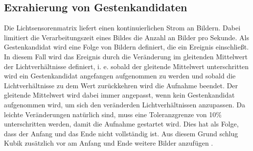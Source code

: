 \subsection{Exrahierung von Gestenkandidaten}
\label{sec:gesture_extraction}
Die Lichtsensorenmatrix liefert einen kontinuierlichen Strom an Bildern. Dabei limitiert die Verarbeitungszeit eines Bildes die Anzahl an Bilder pro Sekunde. Als Gestenkandidat wird eine Folge von Bildern definiert, die
ein Ereignis einschließt. In diesem Fall wird das Ereignis durch die Veränderung im gleitenden Mittelwert der Lichtverhältnisse definiert, i. e. sobald der gleitende Mittelwert unterschritten wird ein Gestenkandidat
angefangen aufgenommen zu werden und sobald die Lichtverhältnisse zu dem Wert zurückkehren wird die Aufnahme beendet. Der gleitende Mittelwert wird dabei immer angepasst, wenn kein Gestenkandidat aufgenommen wird, um
sich den veränderden Lichtverhältnissen anzupassen. Da leichte Veränderungen natürlich sind, muss eine Toleranzgrenze von 10\% unterschritten werden, damit die Aufnahme gestartet wird. Dies hat als Folge, dass der Anfang
und das Ende nicht vollständig ist. Aus diesem Grund schlug Kubik zusätzlich vor am Anfang und Ende weitere Bilder anzufügen \cite{kubikThesis}.
\newline
\newline
